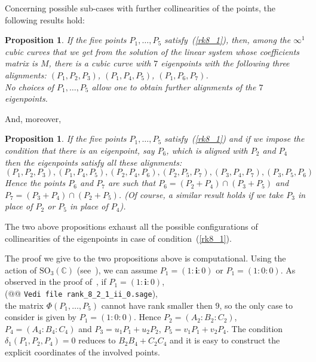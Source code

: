 \documentclass{amsart}
\theoremstyle{plain}
\newtheorem{prop}[lemma]{Proposition}
\theoremstyle{definition}
\newcommand{\iii}{\textbf{i}}
\begin{document}
Concerning possible sub-cases with further collinearities of the points,
the following results hold:
\begin{prop}
\label{three_d_three_alignments}
If the five points $P_1, \dots, P_5$ satisfy~(\ref{rk8_1}),
then, among the $\infty^1$ cubic curves that we get from the
solution of the linear system whose coefficients matrix is $M$, there is
a cubic curve with $7$ eigenpoints with the following three alignments:
$(P_1, P_2, P_3)$, $(P_1, P_4, P_5)$, $(P_1, P_6, P_7)$. \\
No choices of $P_1, \dots, P_5$ allow one to obtain further alignments of the
$7$ eigenpoints.
\end{prop}
And, moreover,
\begin{prop}
\label{prop:d2_6allin}
If the five points $P_1, \dots, P_5$ satisfy~(\ref{rk8_1})
and if we impose the condition that there is an eigenpoint, say $P_6$,
which is aligned with $P_2$ and $P_4$ then the eigenpoints satisfy all these
alignments:
\[
(P_1, P_2, P_3), (P_1, P_4, P_5), (P_2, P_4, P_6), (P_2, P_5, P_7),
(P_3, P_4, P_7), (P_3, P_5, P_6)
\]
Hence the points $P_6$ and $P_7$ are such that
$P_6 = (P_2+P_4) \cap (P_3+P_5)$
and $P_7 = (P_3+P_4) \cap (P_2+P_5)$.
(Of course, a similar result holds if we take $P_3$ in place of $P_2$ or $P_5$
in place of $P_4$).
\end{prop}
The two above propositions exhaust all the possible configurations
of collinearities of the eigenpoints in case of condition~(\ref{rk8_1}).

The proof we give to the two propositions above is computational.
Using the action of $\mathrm{SO}_3(\mathbb{C})$ (see~),
we can assume $P_1= (1: \iii: 0)$ or $P_1= (1: 0: 0)$. As observed
in the proof of~, if $P_1 = (1: \iii: 0)$,\\
(@@ \verb+Vedi file rank_8_2_1_ii_0.sage+), \\
the matrix
$\Phi(P_1, \dots, P_5)$ cannot have rank smaller then $9$, so the only
case to consider is given by $P_1 = (1: 0: 0)$. Hence
$P_2 = (A_2: B_2: C_2)$, $P_4 = (A_4: B_4: C_4)$ and
$P_3 = u_1P_1+u_2P_2$, $P_5=v_1P_1+v_2P_4$.
The condition $\delta_1(P_1, P_2, P_4)=0$ reduces to $B_2B_4+C_2C_4$
and it is easy to construct the explicit coordinates of the involved points.
\end{document}
